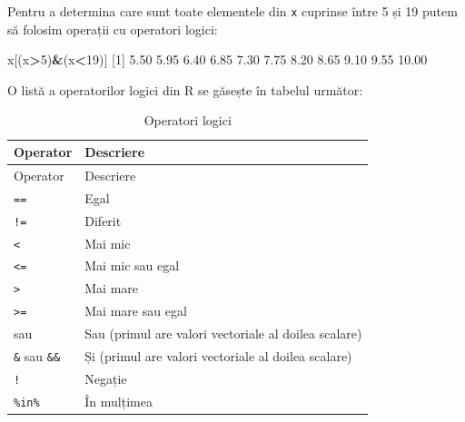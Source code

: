\documentclass[]{article}
\newenvironment{Shaded}{\begin{snugshade}}{\end{snugshade}}
\newcommand{\DecValTok}[1]{\textcolor[rgb]{0.00,0.00,0.81}{#1}}
\newcommand{\FloatTok}[1]{\textcolor[rgb]{0.00,0.00,0.81}{#1}}
\newcommand{\OperatorTok}[1]{\textcolor[rgb]{0.81,0.36,0.00}{\textbf{#1}}}
\newcommand{\NormalTok}[1]{#1}
\begin{document}
Pentru a determina care sunt toate elementele din \texttt{x} cuprinse
între 5 și 19 putem să folosim operații cu operatori logici:

\begin{Shaded}
\begin{Highlighting}[]
\NormalTok{x[(x}\OperatorTok{>}\DecValTok{5}\NormalTok{)}\OperatorTok{&}\NormalTok{(x}\OperatorTok{<}\DecValTok{19}\NormalTok{)]}
\NormalTok{ [}\DecValTok{1}\NormalTok{]  }\FloatTok{5.50}  \FloatTok{5.95}  \FloatTok{6.40}  \FloatTok{6.85}  \FloatTok{7.30}  \FloatTok{7.75}  \FloatTok{8.20}  \FloatTok{8.65}  \FloatTok{9.10}  \FloatTok{9.55} \FloatTok{10.00}
\end{Highlighting}
\end{Shaded}

O listă a operatorilor logici din R se găsește în tabelul următor:

\begin{longtable}[]{@{}ll@{}}
\caption{Operatori logici}\tabularnewline
\toprule
Operator & Descriere\tabularnewline
\midrule
\endfirsthead
\toprule
Operator & Descriere\tabularnewline
\midrule
\endhead
\texttt{==} & Egal\tabularnewline
\texttt{!=} & Diferit\tabularnewline
\texttt{\textless{}} & Mai mic\tabularnewline
\texttt{\textless{}=} & Mai mic sau egal\tabularnewline
\texttt{\textgreater{}} & Mai mare\tabularnewline
\texttt{\textgreater{}=} & Mai mare sau egal\tabularnewline
\texttt{\textbar{}} sau \texttt{\textbar{}\textbar{}} & Sau (primul are
valori vectoriale al doilea scalare)\tabularnewline
\texttt{\&} sau \texttt{\&\&} & Și (primul are valori vectoriale al
doilea scalare)\tabularnewline
\texttt{!} & Negație\tabularnewline
\texttt{\%in\%} & În mulțimea\tabularnewline
\bottomrule
\end{longtable}
\end{document}
